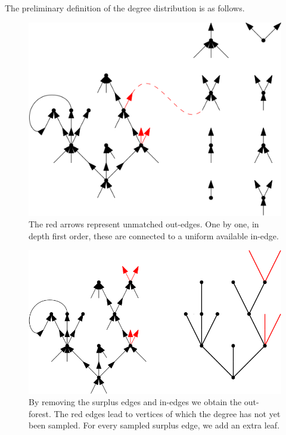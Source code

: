 The preliminary definition of the degree distribution is as follows. 
\begin{figure}
    \centering
    \includegraphics[scale=0.6]{Content/Pictures/Configuration model.png}
    \caption{The red arrows represent unmatched out-edges. One by one, in depth first order, these are connected to a uniform available in-edge.}
    \label{fig.configuration model}
\end{figure}
\begin{figure}
    \centering
    \includegraphics[scale=0.5]{Content/Pictures/Configuration model out-forest.png}
    \caption{By removing the surplus edges and in-edges we obtain the out-forest. The red edges lead to vertices of which the degree has not yet been sampled. For every sampled surplus edge, we add an extra leaf.}
    \label{fig.configuration modeloutforest}
\end{figure}

